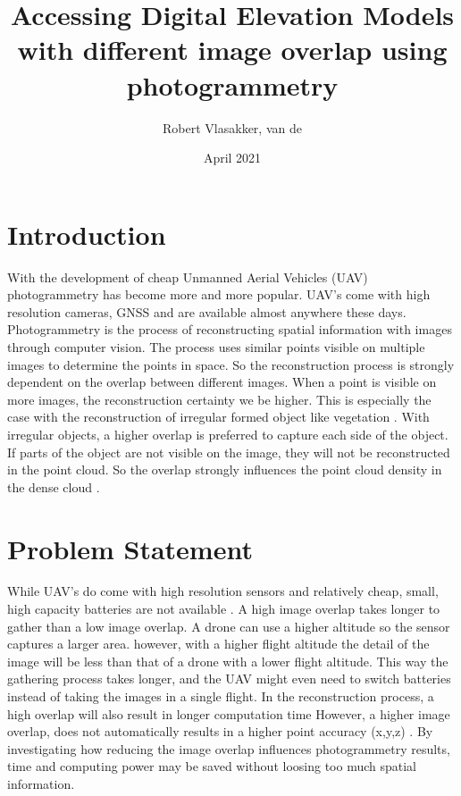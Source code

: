 \documentclass{article}
\title{Accessing Digital Elevation Models with different image overlap using photogrammetry}
\author{Robert Vlasakker, van de}
\date{April 2021}
\begin{document}
\maketitle

\section{Introduction}
With the development of cheap Unmanned Aerial Vehicles (UAV) photogrammetry has become more and more popular. 
UAV's come with high resolution cameras, GNSS and are available almost anywhere these days.
Photogrammetry is the process of reconstructing spatial information with images through computer vision. 
The process uses similar points visible on multiple images to determine the points in space.
So the reconstruction process is strongly dependent on the overlap between different images. 
When a point is visible on more images, the reconstruction certainty we be higher.
This is especially the case with the reconstruction of irregular formed object like vegetation \citep{AccessingImageOverlap}.
With irregular objects, a higher overlap is preferred to capture each side of the object.
If parts of the object are not visible on the image, they will not be reconstructed in the point cloud.
So the overlap strongly influences the point cloud density in the dense cloud \citep{OptimalAltOverWeath}.


\section{Problem Statement}
While UAV's do come with high resolution sensors and relatively cheap, small, high capacity batteries are not available \citep{UAVpopularity}.
A high image overlap takes longer to gather than a low image overlap. 
A drone can use a higher altitude so the sensor captures a larger area.
however, with a higher flight altitude the detail of the image will be less than that of a drone with a lower flight altitude.
This way the gathering process takes longer, and the UAV might even need to switch batteries instead of taking the images in a single flight.
In the reconstruction process, a high overlap will also result in longer computation time \citep{AccessingImageOverlap}
However, a higher image overlap, does not automatically results in a higher point accuracy (x,y,z) \citep{EffectofUABimgcamover}.
By investigating how reducing the image overlap influences photogrammetry results, time and computing power may be saved without loosing too much spatial information.
\end{document}
